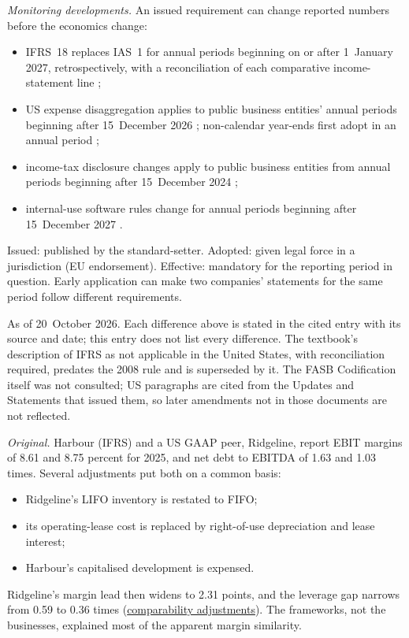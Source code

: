 \begin{qfdefinition}
\emph{Monitoring developments.} An issued requirement can change reported numbers before the economics change:
\begin{itemize}
\item IFRS~18 replaces IAS~1 for annual periods beginning on or after 1~January 2027, retrospectively, with a reconciliation of each comparative income-statement line \citep[Annex, IFRS~18 paras.~C1--C3 and~C8]{eu-2026-338-ifrs18};
\item US expense disaggregation applies to public business entities' annual periods beginning after 15~December 2026 \citep[p.~3]{us-expense-disaggregation-2024}; non-calendar year-ends first adopt in an annual period \citep[p.~1]{us-expense-disaggregation-date-2025};
\item income-tax disclosure changes apply to public business entities from annual periods beginning after 15~December 2024 \citep[p.~5]{us-tax-disclosures-2023};
\item internal-use software rules change for annual periods beginning after 15~December 2027 \citep[p.~3]{us-software-2025}.
\end{itemize}

 Issued: published by the standard-setter. Adopted: given legal force in a jurisdiction (EU endorsement). Effective: mandatory for the reporting period in question. Early application can make two companies' statements for the same period follow different requirements.

 As of 20~October 2026. Each difference above is stated in the cited entry with its source and date; this entry does not list every difference. The textbook's description of IFRS as not applicable in the United States, with reconciliation required, predates the 2008 rule and is superseded by it. The FASB Codification itself was not consulted; US paragraphs are cited from the Updates and Statements that issued them, so later amendments not in those documents are not reflected.

 \emph{Original.} Harbour (IFRS) and a US GAAP peer, Ridgeline, report EBIT margins of 8.61 and 8.75 percent for 2025, and net debt to EBITDA of 1.63 and 1.03 times. Several adjustments put both on a common basis:
\begin{itemize}
\item Ridgeline's LIFO inventory is restated to FIFO;
\item its operating-lease cost is replaced by right-of-use depreciation and lease interest;
\item Harbour's capitalised development is expensed.
\end{itemize}
Ridgeline's margin lead then widens to 2.31 points, and the leverage gap narrows from 0.59 to 0.36 times (\hyperref[meth:accounting-analysis-adjustments]{comparability adjustments}). The frameworks, not the businesses, explained most of the apparent margin similarity.


\end{qfdefinition}

